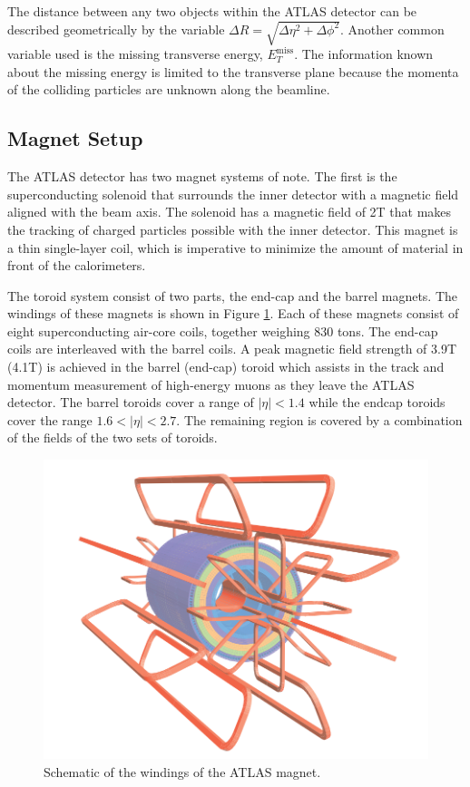 The distance between any two objects within the ATLAS detector can be described geometrically by the variable $\Delta R = \sqrt{\Delta \eta^2 + \Delta \phi^2}$.  Another common variable used is the missing transverse energy, $E^{\text{miss}}_T$.  The information known about the missing energy is limited to the transverse plane because the momenta of the colliding particles are unknown along the beamline. 




\subsection{Magnet Setup}
\label{sec:ATLASMagnet}

The ATLAS detector has two magnet systems of note.  The first is the superconducting solenoid that surrounds the inner detector with a magnetic field aligned with the beam axis.  The solenoid has a magnetic field of 2T that makes the tracking of charged particles possible with the inner detector.  This magnet is a thin single-layer coil, which is imperative to minimize the amount of material in front of the calorimeters. 

The toroid system consist of two parts, the end-cap and the barrel magnets.  The windings of these magnets is shown in Figure \ref{fig:ATLASMagnetWinding}.  Each of these magnets consist of eight superconducting air-core coils, together weighing 830 tons.  The end-cap coils are interleaved with the barrel coils.  A peak magnetic field strength of 3.9T (4.1T) is achieved in the barrel (end-cap) toroid which assists in the track and momentum measurement of high-energy muons as they leave the ATLAS detector.  The barrel toroids cover a range of $|\eta|<1.4$ while the endcap toroids cover the range $1.6 < |\eta| <2.7$.  The remaining region is covered by a combination of the fields of the two sets of toroids.
\begin{figure}[ht!]
	\centering
	\includegraphics[width=0.7\columnwidth]{../ThesisImages/LHCImages/ATLASMagnetWinding.png}
	\caption[Schematic of the windings of the ATLAS magnet.]{Schematic of the windings of the ATLAS magnet\cite{ATLAS}.
	}
	\label{fig:ATLASMagnetWinding}
\end{figure}

